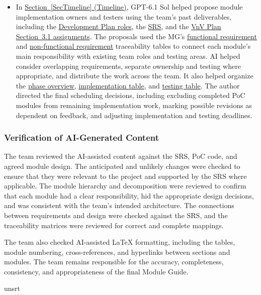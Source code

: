 \documentclass[10pt, titlepage]{article}
\newcommand{\srsurl}{https://team-hindsight.github.io/ophthamology-game/SRS/SRS.pdf}
\newcommand{\vnvplanurl}{https://team-hindsight.github.io/ophthamology-game/VnVPlan/VnVPlan.pdf}
\newcommand{\vnvplanitemref}[2]{\href{\vnvplanurl\#nameddest=#1}{#2}}
\begin{document}
\begin{itemize}
    \item In \hyperref[SecTimeline]{Section~\ref*{SecTimeline} (Timeline)},
    GPT-6.1 Sol helped propose module implementation owners and testers using
    the team's past deliverables, including the
    \href{https://team-hindsight.github.io/ophthamology-game/DevelopmentPlan/DevelopmentPlan.pdf\#nameddest=RoleAssignments}{Development Plan roles},
    the \href{\srsurl}{SRS}, and the
    \vnvplanitemref{tab:VnVTeam}{VnV Plan Section~3.1 assignments}.
    The proposals used the MG's
    \hyperref[TblFRModules]{functional requirement} and
    \hyperref[TblNFRModules]{non-functional requirement} traceability tables
    to connect each module's main responsibility with existing team roles
    and testing areas. AI helped consider overlapping requirements, separate
    ownership and testing where appropriate, and distribute the work across
    the team. It also helped organize the
    \hyperref[TblModulePhases]{phase overview},
    \hyperref[TblModuleImplementation]{implementation table}, and
    \hyperref[TblModuleTesting]{testing table}. The author directed the final
    scheduling decisions, including excluding completed PoC modules from
    remaining implementation work, marking possible revisions as dependent
    on feedback, and adjusting implementation and testing deadlines.
\end{itemize}

\subsubsection*{Verification of AI-Generated Content}

The team reviewed the AI-assisted content against the SRS, PoC code, and
agreed module design. The anticipated and unlikely changes were checked to
ensure that they were relevant to the project and supported by the SRS where
applicable. The module hierarchy and decomposition were reviewed to confirm
that each module had a clear responsibility, hid the appropriate design
decisions, and was consistent with the team's intended architecture. The
connections between requirements and design were checked against the SRS,
and the traceability matrices were reviewed for correct and complete mappings.

The team also checked AI-assisted \LaTeX{} formatting, including the tables,
module numbering, cross-references, and hyperlinks between sections and
modules. The team remains responsible for the accuracy, completeness,
consistency, and appropriateness of the final Module Guide.

\clearpage


\newpage{}

 {unsrt}

\end{document}
